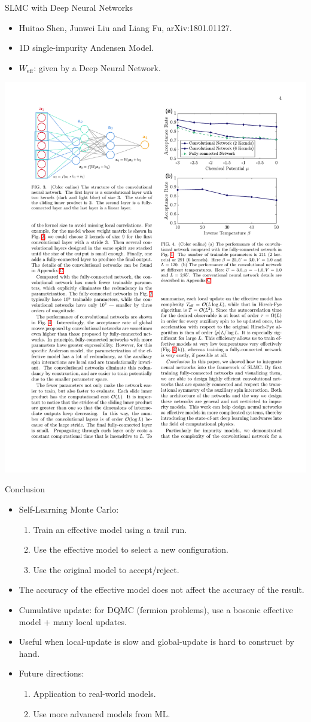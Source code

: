 \documentclass[xcolor=table, 10pt, aspectratio=169]{beamer}
\begin{document}
\begin{frame}{SLMC with Deep Neural Networks}
\begin{itemize}
	\item Huitao Shen, Junwei Liu and Liang Fu, arXiv:1801.01127.
	\item 1D single-impurity Andensen Model.
	\item $W_{\text{eff}}$: given by a Deep Neural Network.
\end{itemize}
\begin{center}
	\includegraphics[width=.6\textwidth]{dnn}
\end{center}
\end{frame}

\begin{frame}{Conclusion}
	\begin{itemize}
		\item Self-Learning Monte Carlo:
		\begin{enumerate}
			\item Train an effective model using a trail run.
			\item Use the effective model to select a new configuration.
			\item Use the original model to accept/reject.
		\end{enumerate}
		\item The accuracy of the effective model does not affect the accuracy of the result.
		\item Cumulative update: for DQMC (fermion problems), use a bosonic effective model + many local updates.
		\item Useful when local-update is slow and global-update is hard to construct by hand.
		\item Future directions:
		\begin{enumerate}
			\item Application to real-world models.
			\item Use more advanced models from ML.
		\end{enumerate}
	\end{itemize}
\end{frame}
\end{document}
